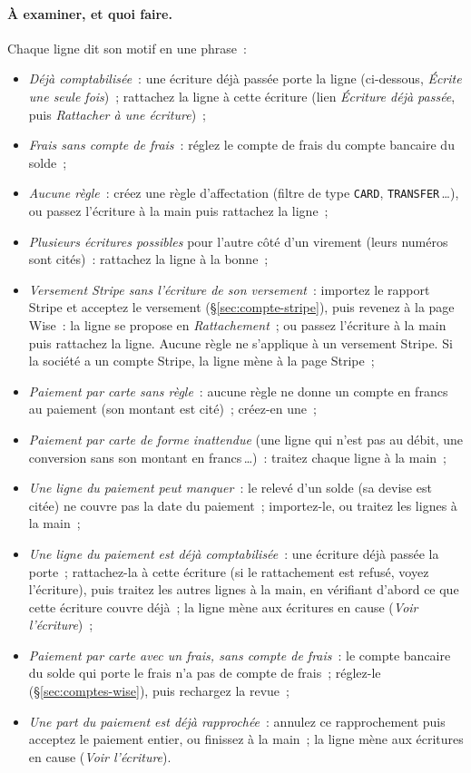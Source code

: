 \documentclass[a4paper,11pt,oneside]{article}
\begin{document}
\paragraph{À examiner, et quoi faire.} Chaque ligne dit son motif en une phrase~:
\begin{itemize}
    \item \emph{Déjà comptabilisée}~: une écriture déjà passée porte la ligne (ci-dessous, \emph{Écrite une seule fois})~; rattachez la ligne à cette écriture (lien \emph{Écriture déjà passée}, puis \emph{Rattacher à une écriture})~;
    \item \emph{Frais sans compte de frais}~: réglez le compte de frais du compte bancaire du solde~;
    \item \emph{Aucune règle}~: créez une règle d'affectation (filtre de type \texttt{CARD}, \texttt{TRANSFER}\,\dots), ou passez l'écriture à la main puis rattachez la ligne~;
    \item \emph{Plusieurs écritures possibles} pour l'autre côté d'un virement (leurs numéros sont cités)~: rattachez la ligne à la bonne~;
    \item \emph{Versement Stripe sans l'écriture de son versement}~: importez le rapport Stripe et acceptez le versement (\S\ref{sec:compte-stripe}), puis revenez à la page Wise~: la ligne se propose en \emph{Rattachement}~; ou passez l'écriture à la main puis rattachez la ligne. Aucune règle ne s'applique à un versement Stripe. Si la société a un compte Stripe, la ligne mène à la page Stripe~;
    \item \emph{Paiement par carte sans règle}~: aucune règle ne donne un compte en francs au paiement (son montant est cité)~; créez-en une~;
    \item \emph{Paiement par carte de forme inattendue} (une ligne qui n'est pas au débit, une conversion sans son montant en francs\,\dots)~: traitez chaque ligne à la main~;
    \item \emph{Une ligne du paiement peut manquer}~: le relevé d'un solde (sa devise est citée) ne couvre pas la date du paiement~; importez-le, ou traitez les lignes à la main~;
    \item \emph{Une ligne du paiement est déjà comptabilisée}~: une écriture déjà passée la porte~; rattachez-la à cette écriture (si le rattachement est refusé, voyez l'écriture), puis traitez les autres lignes à la main, en vérifiant d'abord ce que cette écriture couvre déjà~; la ligne mène aux écritures en cause (\emph{Voir l'écriture})~;
    \item \emph{Paiement par carte avec un frais, sans compte de frais}~: le compte bancaire du solde qui porte le frais n'a pas de compte de frais~; réglez-le (\S\ref{sec:comptes-wise}), puis rechargez la revue~;
    \item \emph{Une part du paiement est déjà rapprochée}~: annulez ce rapprochement puis acceptez le paiement entier, ou finissez à la main~; la ligne mène aux écritures en cause (\emph{Voir l'écriture}).
\end{itemize}
\end{document}
